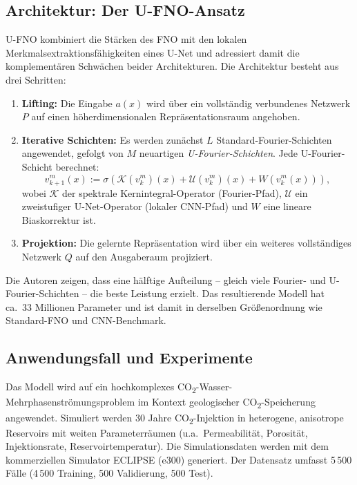 \documentclass[a4paper,12pt]{article}
\begin{document}
\subsection*{Architektur: Der U-FNO-Ansatz}

U-FNO kombiniert die Stärken des FNO mit den lokalen Merkmalsextraktions\-fähigkeiten
eines U-Net und adressiert damit die komplementären Schwächen beider Architekturen.
Die Architektur besteht aus drei Schritten:

\begin{enumerate}
    \item \textbf{Lifting:} Die Eingabe $a(x)$ wird über ein vollständig verbundenes
    Netzwerk $P$ auf einen höherdimensionalen Repräsentationsraum angehoben.

    \item \textbf{Iterative Schichten:} Es werden zunächst $L$ Standard-Fourier-Schichten
    angewendet, gefolgt von $M$ neuartigen \emph{U-Fourier-Schichten}. Jede
    U-Fourier-Schicht berechnet:
    \[
        v^{m}_{k+1}(x) := \sigma\!\left(
            \mathcal{K}(v^{m}_{k})(x)
            + \mathcal{U}(v^{m}_{k})(x)
            + W(v^{m}_{k}(x))
        \right),
    \]
    wobei $\mathcal{K}$ der spektrale Kernintegral-Operator (Fourier-Pfad),
    $\mathcal{U}$ ein zweistufiger U-Net-Operator (lokaler CNN-Pfad) und $W$
    eine lineare Biaskorrektur ist.

    \item \textbf{Projektion:} Die gelernte Repräsentation wird über ein weiteres
    vollständiges Netzwerk $Q$ auf den Ausgaberaum projiziert.
\end{enumerate}

Die Autoren zeigen, dass eine hälftige Aufteilung -- gleich viele Fourier- und
U-Fourier-Schichten -- die beste Leistung erzielt. Das resultierende Modell
hat ca.\ 33 Millionen Parameter und ist damit in derselben Größenordnung wie
Standard-FNO und CNN-Benchmark.

\subsection*{Anwendungsfall und Experimente}

Das Modell wird auf ein hochkomplexes CO\textsubscript{2}-Wasser-Mehrphasenströmungsproblem
im Kontext geologischer CO\textsubscript{2}-Speicherung angewendet. Simuliert werden
30 Jahre CO\textsubscript{2}-Injektion in heterogene, anisotrope Reservoirs mit weiten
Parameterräumen (u.a.\ Permeabilität, Porosität, Injektionsrate, Reservoirtemperatur).
Die Simulationsdaten werden mit dem kommerziellen Simulator ECLIPSE (e300) generiert.
Der Datensatz umfasst 5\,500 Fälle (4\,500 Training, 500 Validierung, 500 Test).
\end{document}
